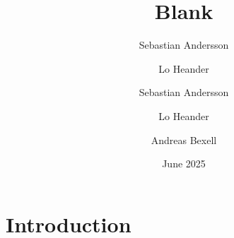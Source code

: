 \documentclass{article}
\title{Blank}
\author{Sebastian Andersson}
\author{Lo Heander}
\author{Sebastian Andersson \and Lo Heander \and Andreas Bexell}
\date{June 2025}
\begin{document}
\maketitle

\section{Introduction}
\end{document}

